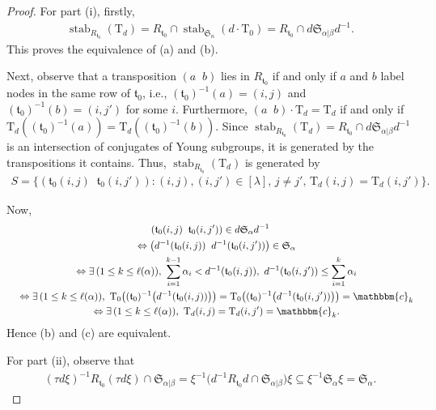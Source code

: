 \documentclass[pdftex]{sigma}
\renewcommand{\t}{\mathfrak{t}}
\newcommand{\T}{\mathrm{T}}
\newcommand{\stab}{\operatorname{stab}}
\newcommand{\sym}[1]{\mathfrak{S}_{#1}}
\newcommand{\bb}[1]{\mathbbm{{#1}}}
\begin{document}
\begin{proof} For part (i), firstly,
\begin{gather*}
\stab_{R_{\t_0}} (\T_d) = R_{\t_0} \cap \stab_{\sym{n}} (d \cdot \T_0) = R_{\t_0} \cap d \sym{\alpha|\beta} d^{-1}.
\end{gather*}
This proves the equivalence of (a) and (b).

Next, observe that a transposition $(a \;\; b)$ lies in $R_{\t_0}$ if and only if $a$ and $b$ label nodes in the same row of $\t_0$, i.e., $(\t_0)^{-1}(a) = (i,j)$ and $(\t_0)^{-1}(b) = (i,j')$ for some $i$. Furthermore, $(a \;\; b) \cdot \T_d = \T_d$ if and only if $\T_d((\t_0)^{-1}(a)) = \T_d((\t_0)^{-1}(b))$.
Since $\stab_{R_{\t_0}} (\T_d) = R_{\t_0} \cap d \sym{\alpha|\beta} d^{-1}$ is an intersection of conjugates of Young subgroups, it is generated by the transpositions it contains. Thus, $\stab_{R_{\t_0}} (\T_d)$ is generated by
\begin{gather*}
S = \big\{ (\t_0(i,j) \;\; \t_0(i,j')) \colon(i,j),(i,j') \in [\lambda],\, j \ne j',\, \T_d(i,j) = \T_d(i,j') \big\}.
\end{gather*}

Now,
\begin{gather*}
 (\t_0(i,j) \;\; \t_0(i,j')) \in d\sym{\alpha} d^{-1} \\
\quad {} \Leftrightarrow \big( d^{-1}(\t_0(i,j)) \;\; d^{-1}(\t_0(i,j'))\big) \in \sym{\alpha} \\
\quad {}\Leftrightarrow \exists\, (1 \leq k \leq \ell(\alpha)), \
\sum_{i=1}^{k-1} \alpha_i < d^{-1}(\t_0(i,j)), \ d^{-1}(\t_0(i,j')) \leq \sum_{i=1}^{k} \alpha_i\\
\quad {}\Leftrightarrow \exists\, (1 \leq k \leq \ell(\alpha)), \ \T_0 \big((\t_0)^{-1} \big(d^{-1}(\t_0(i,j))\big)\big) = \T_0 \big((\t_0)^{-1} \big( d^{-1}(\t_0(i,j'))\big)\big) = \bb{c}_k \\
\quad {} \Leftrightarrow \exists\, (1 \leq k \leq \ell(\alpha)), \ \T_d (i,j) = \T_d (i,j') = \bb{c}_k .
\end{gather*}
Hence (b) and (c) are equivalent.

For part (ii), observe that
\begin{gather*}
(\tau d \xi)^{-1} R_{\t_0} (\tau d \xi) \cap \sym{\alpha|\beta} = \xi^{-1}\big(d^{-1}R_{\t_0}d\cap \sym{\alpha|\beta}\big)\xi \subseteq
\xi^{-1}\sym{\alpha}\xi = \sym{\alpha}.\tag*{\qed}
\end{gather*}\renewcommand{\qed}{}
\end{proof}
\end{document}

